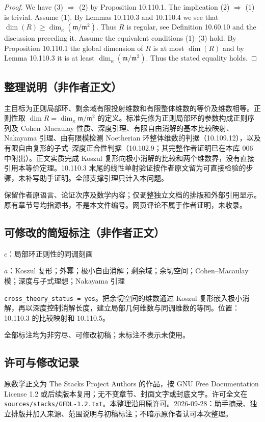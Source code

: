 \documentclass[UTF8,11pt]{ctexart}
\theoremstyle{definition}
\begin{document}
\begin{proof}
We have (3) $\Rightarrow$ (2) by Proposition 10.110.1. The implication (2) $\Rightarrow$ (1) is trivial. Assume (1). By Lemmas 10.110.3 and 10.110.4 we see that $\dim(R)\geq\dim_\kappa(\mathfrak m/\mathfrak m^2)$. Thus $R$ is regular, see Definition 10.60.10 and the discussion preceding it. Assume the equivalent conditions (1)--(3) hold. By Proposition 10.110.1 the global dimension of $R$ is at most $\dim(R)$ and by Lemma 10.110.3 it is at least $\dim_\kappa(\mathfrak m/\mathfrak m^2)$. Thus the stated equality holds.
\end{proof}

\subsection*{整理说明（非作者正文）}
主目标为正则局部环、剩余域有限投射维数和有限整体维数的等价及维数相等。正则性取 $\dim R=\dim_\kappa\mathfrak m/\mathfrak m^2$ 的定义。标准先修为正则局部环的参数构成正则序列及 Cohen--Macaulay 性质、深度引理、有限自由消解的基本比较映射、Nakayama 引理、由有限模检测 Noetherian 环整体维数的判据（10.109.12），以及有限自由复形的子式--深度正合性判据（10.102.9；其完整作者证明已在本库 006 中附出）。正文实质完成 Koszul 复形向极小消解的比较和两个维数界，没有直接引用本等价定理。10.110.3 末尾的线性单射验证按作者原文留为可直接检验的步骤，未补写助手证明。全部支撑引理只计入本问题。

保留作者原语言、论证次序及数学内容；仅调整独立文档的排版和外部引用显示。原有章节号均指源书，不是本文件编号。网页评论不属于作者证明，未收录。
\subsection*{可修改的简短标注（非作者正文）}
$c$：局部环正则性的同调刻画

$a$：Koszul 复形；外幂；极小自由消解；剩余域；余切空间；Cohen--Macaulay 模；深度与子式理想；Nakayama 引理

\texttt{cross\_theory\_status = yes}。把余切空间的维数通过 Koszul 复形嵌入极小消解，再以深度控制消解长度，建立局部几何维数与同调维数的等同。位置：10.110.3 的比较映射和 10.110.5。

全部标注均为非穷尽、可修改初稿；未标注不表示未使用。
\subsection*{许可与修改记录}
原数学正文为 The Stacks Project Authors 的作品，按 GNU Free Documentation License 1.2 或后续版本复用；无不变章节、封面文字或封底文字。许可全文在 \texttt{sources/stacks/GFDL-1.2.txt}。本整理沿用原许可。2026-09-28：助手摘录、独立排版并加入来源、范围说明与初稿标注；不暗示原作者认可本次整理。
\end{document}
